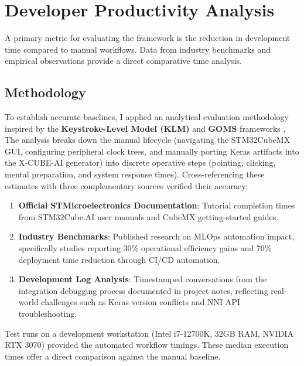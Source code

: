 \section{Developer Productivity Analysis}
\label{sec:productivity}

A primary metric for evaluating the framework is the reduction in development time compared to manual workflows. Data from industry benchmarks and empirical observations provide a direct comparative time analysis.

\subsection{Methodology}

To establish accurate baselines, I applied an analytical evaluation methodology inspired by the \textbf{Keystroke-Level Model (KLM)} and \textbf{GOMS} frameworks \cite{card1980keystroke, baek2014evaluating}. The analysis breaks down the manual lifecycle (navigating the STM32CubeMX GUI, configuring peripheral clock trees, and manually porting Keras artifacts into the X-CUBE-AI generator) into discrete operative steps (pointing, clicking, mental preparation, and system response times). Cross-referencing these estimates with three complementary sources verified their accuracy:

\begin{enumerate}
    \item \textbf{Official STMicroelectronics Documentation}: Tutorial completion times from STM32Cube.AI user manuals and CubeMX getting-started guides\cite{st_cubemx_manual}.
    \item \textbf{Industry Benchmarks}: Published research on MLOps automation impact, specifically studies reporting 30\% operational efficiency gains and 70\% deployment time reduction through CI/CD automation\cite{mlops_productivity_2024, embedded_ml_cicd_2025}.
    \item \textbf{Development Log Analysis}: Timestamped conversations from the integration debugging process documented in project notes, reflecting real-world challenges such as Keras version conflicts and NNI API troubleshooting.
\end{enumerate}

Test runs on a development workstation (Intel i7-12700K, 32GB RAM, NVIDIA RTX 3070) provided the automated workflow timings. These median execution times offer a direct comparison against the manual baseline.

